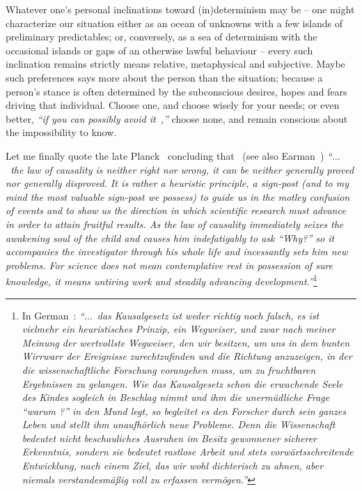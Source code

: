Whatever one's personal inclinations toward (in)determinism may be --
one might characterize our situation either as
an ocean of unknowns with a few islands of preliminary predictables;
or, conversely, as a sea of determinism with the occasional islands or gaps of
an otherwise lawful behaviour
--
every such inclination remains strictly means relative, metaphysical and subjective.
Maybe such preferences says more about the person than the situation;
because a person's stance is often determined by the subconscious desires, hopes and fears driving that individual.
Choose one, and choose wisely for your needs; or even better, {\em ``if you can possibly
avoid it~\cite[p.~129]{feynman-law},''}
choose none,
and remain conscious about the impossibility to know.



Let me finally quote the late Planck~\cite{Planck:1932:KPGb} concluding that~\cite[p.~539]{Planck-32-coc}
(see also Earman~\cite[p-1372]{Earman20071369})
{\em ``$\ldots$~the law of causality is neither right nor
wrong, it can be neither generally proved nor generally disproved. It is rather a
heuristic principle, a sign-post (and to my mind the most valuable sign-post we
possess) to guide us in the motley confusion of events and to show us the direction
in which scientific research must advance in order to attain fruitful results. As the
law of causality immediately seizes the awakening soul of the child and causes him
indefatigably to ask ``Why?'' so it accompanies the investigator through his whole
life and incessantly sets him new problems. For science does not mean contemplative
rest in possession of sure knowledge, it means untiring work and steadily
advancing development.''}\footnote{In German~\cite[p.~26]{Planck:1932:KPGb}:
{\em
``$\ldots$~das Kausalgesetz
ist weder richtig noch falsch, es ist vielmehr ein heuristisches Prinzip, ein Wegweiser, und zwar nach meiner
Meinung der wertvollste Wegweiser, den wir besitzen,
um uns in dem bunten Wirrwarr der Ereignisse zurechtzufinden
und die Richtung anzuzeigen, in der die wissenschaftliche
Forschung vorangehen muss, um zu fruchtbaren
Ergebnissen zu gelangen.
Wie das Kausalgesetz schon
die erwachende Seele des Kindes sogleich in Beschlag nimmt
und ihm die unerm\"udliche Frage ``warum ?'' in den Mund
legt, so begleitet es den Forscher durch sein ganzes Leben
und stellt ihm unaufh\"orlich neue Probleme. Denn die Wissenschaft
bedeutet nicht beschauliches Ausruhen im Besitz
gewonnener sicherer Erkenntnis, sondern sie bedeutet rastlose
Arbeit und stets vorw\"artsschreitende Entwicklung, nach
einem Ziel, das wir wohl dichterisch zu ahnen, aber niemals
verstandesm\"a{\ss}ig voll zu erfassen verm\"ogen.''}
}


